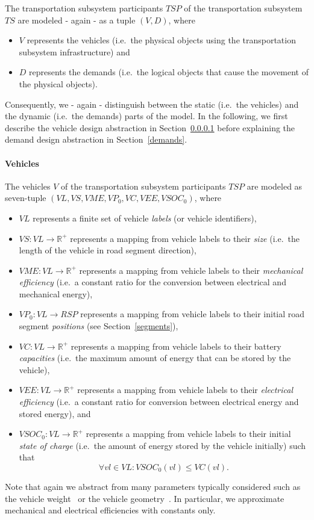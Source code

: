 The transportation subsystem participants $TSP$ of the transportation subsystem $TS$ are modeled - again - as a tuple $(V, D)$, where
\begin{itemize}
	\item $V$ represents the vehicles (i.e.\ the physical objects using the transportation subsystem infrastructure) and
	\item $D$ represents the demands (i.e.\ the logical objects that cause the movement of the physical objects).
\end{itemize}
Consequently, we - again - distinguish between the static (i.e.\ the vehicles) and the dynamic (i.e.\ the demands) parts of the model. In the following, we first describe the vehicle design abstraction in Section~\ref{vehicles} before explaining the demand design abstraction in Section~\ref{demands}.

\paragraph{Vehicles}
\label{vehicles}

The vehicles $V$ of the transportation subsystem participants $TSP$ are modeled as seven-tuple $(VL, VS, VME, VP_0, VC, VEE, VSOC_0)$, where
\begin{itemize}
	\item $VL$ represents a finite set of vehicle \textit{labels} (or vehicle identifiers),
	\item $VS: VL \rightarrow \mathbb{R}^+$ represents a mapping from vehicle labels to their \textit{size} (i.e.\ the length of the vehicle in road segment direction),
	\item $VME: VL \rightarrow \mathbb{R}^+$ represents a mapping from vehicle labels to their \textit{mechanical efficiency} (i.e.\ a constant ratio for the conversion between electrical and mechanical energy),
	\item $VP_0: VL \rightarrow RSP$ represents a mapping from vehicle labels to their initial road segment \textit{positions} (see Section~\ref{segments}),
	\item $VC: VL \rightarrow \mathbb{R}^+$ represents a mapping from vehicle labels to their battery \textit{capacities} (i.e.\ the maximum amount of energy that can be stored by the vehicle),
	\item $VEE: VL \rightarrow \mathbb{R}^+$ represents a mapping from vehicle labels to their \textit{electrical efficiency} (i.e.\ a constant ratio for conversion between electrical energy and stored energy), and
	\item $VSOC_0: VL \rightarrow \mathbb{R}^+$ represents a mapping from vehicle labels to their initial \textit{state of charge} (i.e.\ the amount of energy stored by the vehicle initially) such that
	\[
		\forall vl \in VL : VSOC_0(vl) \leq VC(vl) \textrm{.}
	\]
\end{itemize}
Note that again we abstract from many parameters typically considered such as the vehicle weight~\cite{?} or the vehicle geometry~\cite{?}. In particular, we approximate mechanical and electrical efficiencies with constants only.

